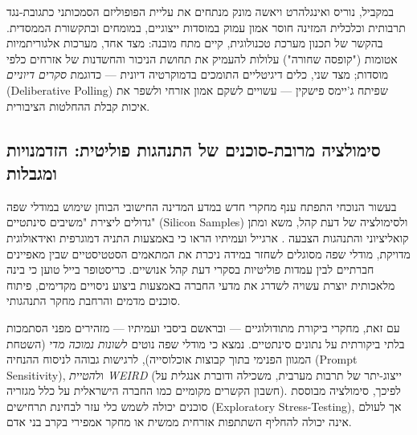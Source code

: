 במקביל, נוריס ואינגלהרט \cite{norris2019cultural} ויאשה מונק \cite{mounk2018people} מנתחים את עליית הפופוליזם הסמכותני כתגובת-נגד תרבותית וכלכלית המזינה חוסר אמון עמוק במוסדות ייצוגיים, במומחים ובתקשורת הממסדית. בהקשר של תכנון מערכת טכנולוגית, קיים מתח מובנה: מצד אחד, מערכות אלגוריתמיות אטומות ("קופסה שחורה") עלולות להעמיק את תחושת הניכור והחשדנות של אזרחים כלפי מוסדות; מצד שני, כלים דיגיטליים התומכים בדמוקרטיה דיונית --- כדוגמת \emph{סקרים דיוניים} (Deliberative Polling) שפיתח ג'יימס פישקין \cite{fishkin2018democracy} --- עשויים לשקם אמון אזרחי ולשפר את איכות קבלת ההחלטות הציבורית.

\subsection{סימולציה מרובת-סוכנים של התנהגות פוליטית: הזדמנויות ומגבלות}
בעשור הנוכחי התפתח ענף מחקרי חדש במדע המדינה החישובי הבוחן שימוש במודלי שפה גדולים ליצירת "משיבים סינתטיים" (Silicon Samples) ולסימולציה של דעת קהל, משא ומתן קואליציוני והתנהגות הצבעה \cite{argyle2023out, bail2024can}. ארגייל ועמיתיו \cite{argyle2023out} הראו כי באמצעות התניה דמוגרפית ואידאולוגית מדויקת, מודלי שפה מסוגלים לשחזר במידה ניכרת את המתאמים הסטטיסטיים שבין מאפיינים חברתיים לבין עמדות פוליטיות בסקרי דעת קהל אנושיים. כריסטופר בייל \cite{bail2024can} טוען כי בינה מלאכותית יוצרת עשויה לשדרג את מדעי החברה באמצעות ביצוע ניסויים מקדימים, פיתוח סוכנים מדמים והרחבת מחקר התנהגותי.

עם זאת, מחקרי ביקורת מתודולוגיים --- ובראשם ביסבי ועמיתיו \cite{bisbee2024synthetic} --- מזהירים מפני הסתמכות בלתי ביקורתית על נתונים סינתטיים. נמצא כי מודלי שפה נוטים ל\emph{שונות נמוכה מדי} (השטחת המגוון הפנימי בתוך קבוצות אוכלוסייה), לרגישות גבוהה לניסוח ההנחיה (Prompt Sensitivity), ול\emph{הטיית WEIRD} (ייצוג-יתר של תרבות מערבית, משכילה ודוברת אנגלית על חשבון הקשרים מקומיים כמו החברה הישראלית על כלל מגזריה). לפיכך, סימולציה מבוססת סוכנים יכולה לשמש כלי עזר לבחינת תרחישים (Exploratory Stress-Testing), אך לעולם אינה יכולה להחליף השתתפות אזרחית ממשית או מחקר אמפירי בקרב בני אדם.

